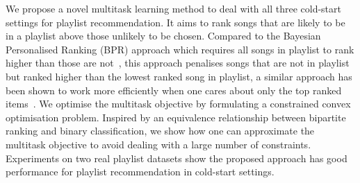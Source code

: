 We propose a novel multitask learning method to %
deal with all three cold-start settings for playlist recommendation.
It aims to rank songs that are likely to be in a playlist %
above those unlikely to be chosen.
Compared to the Bayesian Personalised Ranking (BPR) approach which requires all
songs in playlist to rank higher than those are not~\cite{rendle2009bpr,mcfee2012million}, 
this approach penalises songs that are not in playlist but ranked higher than the lowest ranked song in playlist,
a similar approach has been shown to work more efficiently when one cares about only the top ranked items~\cite{li2014top}.
%
We optimise the multitask objective by formulating %
a constrained convex optimisation problem.
Inspired by an equivalence relationship between bipartite ranking and binary classification,
we show how one can approximate the multitask objective to avoid dealing with a large number of constraints.
Experiments on two real playlist datasets show the proposed approach 
has good performance for playlist recommendation in cold-start settings.

